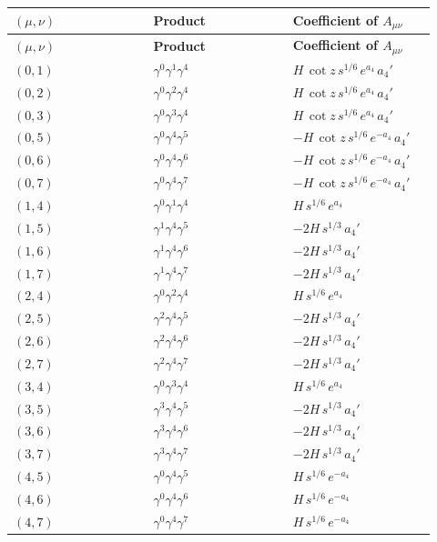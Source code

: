 \documentclass[11pt]{article}
\begin{document}
\begin{longtable}{@{}p{0.307\linewidth}p{0.307\linewidth}p{0.307\linewidth}@{}}
\toprule
\textbf{$(\mu,\nu)$} & \textbf{Product} & \textbf{Coefficient of $A_{\mu\nu}$} \\
\midrule
\endfirsthead
\toprule
\textbf{$(\mu,\nu)$} & \textbf{Product} & \textbf{Coefficient of $A_{\mu\nu}$} \\
\midrule
\endhead
$(0,1)$ & $\gamma^{0}\gamma^{1}\gamma^{4}$ & $H\,\cot z\,s^{1/6}\,e^{a_4}\,a_4'$ \\
$(0,2)$ & $\gamma^{0}\gamma^{2}\gamma^{4}$ & $H\,\cot z\,s^{1/6}\,e^{a_4}\,a_4'$ \\
$(0,3)$ & $\gamma^{0}\gamma^{3}\gamma^{4}$ & $H\,\cot z\,s^{1/6}\,e^{a_4}\,a_4'$ \\
$(0,5)$ & $\gamma^{0}\gamma^{4}\gamma^{5}$ & $-H\,\cot z\,s^{1/6}\,e^{-a_4}\,a_4'$ \\
$(0,6)$ & $\gamma^{0}\gamma^{4}\gamma^{6}$ & $-H\,\cot z\,s^{1/6}\,e^{-a_4}\,a_4'$ \\
$(0,7)$ & $\gamma^{0}\gamma^{4}\gamma^{7}$ & $-H\,\cot z\,s^{1/6}\,e^{-a_4}\,a_4'$ \\
$(1,4)$ & $\gamma^{0}\gamma^{1}\gamma^{4}$ & $H\,s^{1/6}\,e^{a_4}$ \\
$(1,5)$ & $\gamma^{1}\gamma^{4}\gamma^{5}$ & $-2H\,s^{1/3}\,a_4'$ \\
$(1,6)$ & $\gamma^{1}\gamma^{4}\gamma^{6}$ & $-2H\,s^{1/3}\,a_4'$ \\
$(1,7)$ & $\gamma^{1}\gamma^{4}\gamma^{7}$ & $-2H\,s^{1/3}\,a_4'$ \\
$(2,4)$ & $\gamma^{0}\gamma^{2}\gamma^{4}$ & $H\,s^{1/6}\,e^{a_4}$ \\
$(2,5)$ & $\gamma^{2}\gamma^{4}\gamma^{5}$ & $-2H\,s^{1/3}\,a_4'$ \\
$(2,6)$ & $\gamma^{2}\gamma^{4}\gamma^{6}$ & $-2H\,s^{1/3}\,a_4'$ \\
$(2,7)$ & $\gamma^{2}\gamma^{4}\gamma^{7}$ & $-2H\,s^{1/3}\,a_4'$ \\
$(3,4)$ & $\gamma^{0}\gamma^{3}\gamma^{4}$ & $H\,s^{1/6}\,e^{a_4}$ \\
$(3,5)$ & $\gamma^{3}\gamma^{4}\gamma^{5}$ & $-2H\,s^{1/3}\,a_4'$ \\
$(3,6)$ & $\gamma^{3}\gamma^{4}\gamma^{6}$ & $-2H\,s^{1/3}\,a_4'$ \\
$(3,7)$ & $\gamma^{3}\gamma^{4}\gamma^{7}$ & $-2H\,s^{1/3}\,a_4'$ \\
$(4,5)$ & $\gamma^{0}\gamma^{4}\gamma^{5}$ & $H\,s^{1/6}\,e^{-a_4}$ \\
$(4,6)$ & $\gamma^{0}\gamma^{4}\gamma^{6}$ & $H\,s^{1/6}\,e^{-a_4}$ \\
$(4,7)$ & $\gamma^{0}\gamma^{4}\gamma^{7}$ & $H\,s^{1/6}\,e^{-a_4}$ \\
\bottomrule
\end{longtable}
\end{document}
